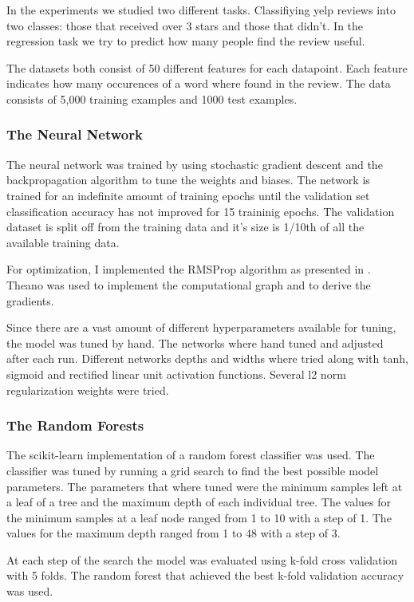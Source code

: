 
In the experiments we studied two different tasks. Classifiying yelp reviews into two classes: those that received over 3 stars and those that didn't. In the regression task we try to predict how many people find the review useful.

The datasets both consist of 50 different features for each datapoint. Each feature indicates how many occurences of a word where found in the review. The data consists of 5,000 training examples and 1000 test examples.

\subsubsection{The Neural Network}

The neural network was trained by using stochastic gradient descent and the backpropagation algorithm to tune the weights and biases. The network is trained for an indefinite amount of training epochs until the validation set classification accuracy has not improved for 15 traininig epochs. The validation dataset is split off from the training data and it's size is 1/10th of all the available training data.

For optimization, I implemented the RMSProp algorithm as presented in \cite{deep-learning-book}. Theano \cite{theano} was used to implement the computational graph and to derive the gradients.

Since there are a vast amount of different hyperparameters available for tuning, the model was tuned by hand. The networks where hand tuned and adjusted after each run. Different networks depths and widths where tried along with tanh, sigmoid and rectified linear unit activation functions. Several l2 norm regularization weights were tried.

\subsubsection{The Random Forests}

The scikit-learn \cite{sklearn} implementation of a random forest classifier was used. The classifier was tuned by running a grid search to find the best possible model parameters. The parameters that where tuned were the minimum samples left at a leaf of a tree and the maximum depth of each individual tree. The values for the minimum samples at a leaf node ranged from 1 to 10 with a step of 1. The values for the maximum depth ranged from 1 to 48 with a step of 3.

At each step of the search the model was evaluated using k-fold cross validation with 5 folds. The random forest that achieved the best k-fold validation accuracy was used.


